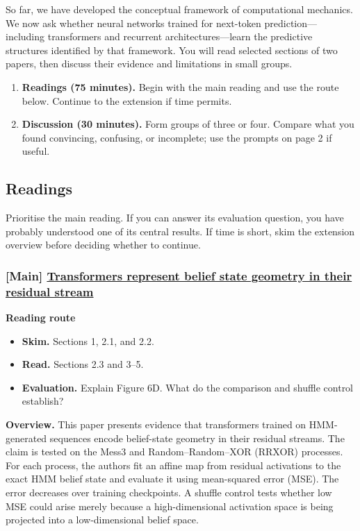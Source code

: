
So far, we have developed the conceptual framework of computational mechanics.
We now ask whether neural networks trained for next-token prediction---including
transformers and recurrent architectures---learn the predictive structures
identified by that framework. You will read selected sections of two papers,
then discuss their evidence and limitations in small groups.

\begin{callout}
  \begin{enumerate}
    \item \textbf{Readings (75 minutes).} Begin with the main reading and use
      the route below. Continue to the extension if time permits.
    \item \textbf{Discussion (30 minutes).} Form groups of three or four.
      Compare what you found convincing, confusing, or incomplete; use the
      prompts on page 2 if useful.
  \end{enumerate}
\end{callout}

\subsection{Readings}
Prioritise the main reading. If you can answer its evaluation question, you
have probably understood one of its central results. If time is short, skim
the extension overview before deciding whether to continue.

\subsubsection{[Main] \href{https://arxiv.org/pdf/2405.15943}{Transformers represent belief state geometry in their residual stream}}
  \textbf{Reading route}
\begin{itemize}
    \item \textbf{Skim.} Sections 1, 2.1, and 2.2.
    \item \textbf{Read.} Sections 2.3 and 3--5.
    \item \textbf{Evaluation.} Explain Figure 6D. What do the comparison and
      shuffle control establish?
  \end{itemize}

  \textbf{Overview.} This paper presents evidence that transformers trained on
  HMM-generated sequences encode belief-state geometry in their residual
  streams. The claim is tested on the Mess3 and Random--Random--XOR (RRXOR)
  processes. For each process, the authors fit an affine map from residual
  activations to the exact HMM belief state and evaluate it using mean-squared
  error (MSE). The error decreases over training checkpoints. A shuffle
  control tests whether low MSE could arise merely because a high-dimensional
  activation space is being projected into a low-dimensional belief space.

